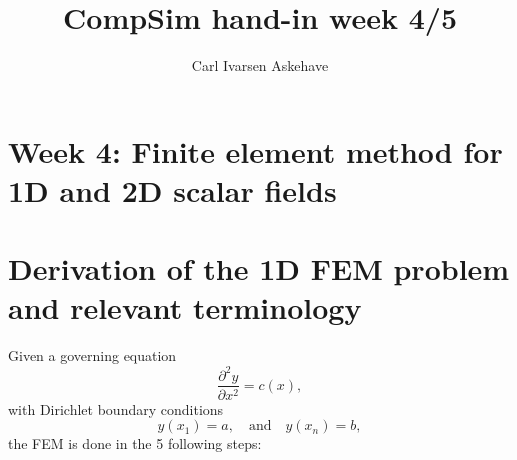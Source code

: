 \documentclass[acmtog]{acmart}
\begin{document}
\title{CompSim hand-in week 4/5}
\author{Carl Ivarsen Askehave}

\maketitle
\thispagestyle{empty}
\section*{\textbf{Week 4: Finite element method for 1D and 2D scalar fields}}
\section{Derivation of the 1D FEM problem and relevant terminology}
Given a governing equation
%
\begin{equation}
  \frac{ \partial^{2} y }{ \partial x^{2} } = c(x),
\end{equation}
%
with Dirichlet boundary conditions
%
\begin{equation}
  y(x_1) = a, \quad \text{and} \quad y(x_n) = b,
\end{equation}
%
the FEM is done in the 5 following steps:
\end{document}
